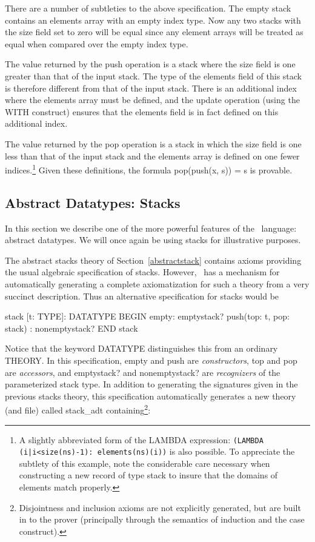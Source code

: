 There are a number of subtleties to the above specification.  The {\stt
empty} stack contains an {\stt elements} array with an empty index type.
Now any two stacks with the {\stt size} field set to zero will be equal
since any element arrays will be treated as equal when compared over
the empty index type.

The value returned by the {\stt push} operation is a stack where the size
field is one greater than that of the input stack.  The type of the {\stt
elements} field of this stack is therefore different from that of the
input stack.  There is an additional index where the {\stt elements}
array must be defined, and the update operation (using the {\stt WITH}
construct) ensures that the {\stt elements} field is in fact defined on
this additional index.

The value returned by the {\stt pop} operation is a stack in which
the size field is one less than that of the input stack and the
{\stt elements} array is defined on one fewer indices.\footnote
{A slightly abbreviated form of the {\stt LAMBDA} expression:
\texttt{(LAMBDA (i|i<size(ns)-1): elements(ns)(i))}
is also possible.  To appreciate the subtlety of this example, note
the considerable care necessary when constructing a new record of type
{\stt stack} to insure that the domains of {\stt elements} match
properly.}  Given these definitions, the formula {\stt pop(push(x, s)) = s}
is provable.

\subsection{Abstract Datatypes: Stacks}
\label{datatypes}

In this section we describe one of the more powerful features of the
\pvs\ language: abstract datatypes.  We will once again be using stacks
for illustrative purposes.

The abstract {\stt stacks} theory of Section~\ref{abstractstack} contains
axioms providing the
usual algebraic specification of stacks.  However, \pvs\ has a mechanism
for automatically generating a complete axiomatization for such a theory
from a very succinct
description.  Thus an alternative specification for stacks would be
\begin{pvsexample}
  stack [t: TYPE]: DATATYPE
   BEGIN
    empty: emptystack?
    push(top: t, pop: stack) : nonemptystack?
   END stack
\end{pvsexample}
Notice that the keyword {\stt DATATYPE} distinguishes this from an
ordinary {\stt THEORY}.
In this specification, {\stt empty} and {\stt push} are {\em
constructors\/}, {\stt top} and {\stt pop} are {\em accessors\/}, and {\stt
emptystack?} and {\stt nonemptystack?} are {\em recognizers\/} of the
parameterized {\stt stack} type.  In addition to generating the
signatures given in the previous {\stt stacks} theory, this specification
automatically generates a new theory (and file) called {\stt stack\_adt}
containing\footnote{Disjointness and inclusion axioms are not explicitly
generated, but are built in to the prover (principally through the semantics
of induction and the case construct).}:

